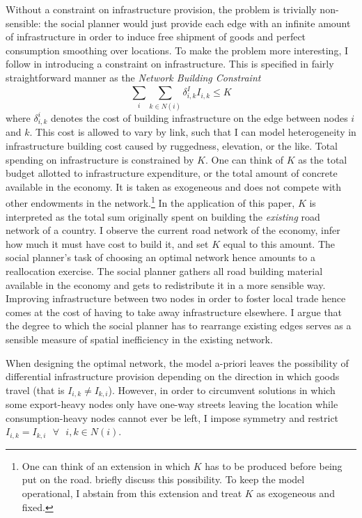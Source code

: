 \documentclass[11pt, oneside]{article}   	%
\begin{document}
Without a constraint on infrastructure provision, the problem is trivially non-sensible: the social planner would just provide each edge with an infinite amount of infrastructure in order to induce free shipment of goods and perfect consumption smoothing over locations. To make the problem more interesting, I follow \citeauthor{Fajgelbaum_OptimalTransportNetworks_2017} in introducing a constraint on infrastructure. This is specified in fairly straightforward manner as the \emph{Network Building Constraint}
\begin{equation}
  \sum_{i}^{}\sum_{k\in N(i)}^{}\delta^{I}_{i,k}I_{i,k} \leq K
  \label{eq:network_building}
\end{equation}
where $\delta^{i}_{i,k}$ denotes the cost of building infrastructure on the edge between nodes $i$ and $k$. This cost is allowed to vary by link, such that I can model heterogeneity in infrastructure building cost caused by ruggedness, elevation, or the like. Total spending on infrastructure is constrained by $K$. One can think of $K$ as the total budget allotted to infrastructure expenditure, or the total amount of concrete available in the economy. It is taken as exogeneous and does not compete with other endowments in the network.\footnote{One can think of an extension in which $K$ has to be produced before being put on the road. \citeauthor{Fajgelbaum_OptimalTransportNetworks_2017} briefly discuss this possibility. To keep the model operational, I abstain from this extension and treat $K$ as exogeneous and fixed.} In the application of this paper, $K$ is interpreted as the total sum originally spent on building the \emph{existing} road network of a country. I observe the current road network of the economy, infer how much it must have cost to build it, and set $K$ equal to this amount. The social planner's task of choosing an optimal network hence amounts to a reallocation exercise. The social planner gathers all road building material available in the economy and gets to redistribute it in a more sensible way. Improving infrastructure between two nodes in order to foster local trade hence comes at the cost of having to take away infrastructure elsewhere. I argue that the degree to which the social planner has to rearrange existing edges serves as a sensible measure of spatial inefficiency in the existing network.

When designing the optimal network, the model a-priori leaves the possibility of differential infrastructure provision depending on the direction in which goods travel (that is $I_{i,k} \neq I_{k,i}$). However, in order to circumvent solutions in which some export-heavy nodes only have one-way streets leaving the location while consumption-heavy nodes cannot ever be left, I impose symmetry and restrict $I_{i,k} = I_{k,i} \textrm{ } \forall \textrm{ } i,k\in N(i)$.
\end{document}
